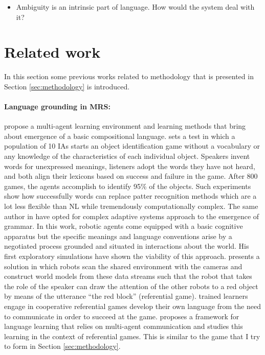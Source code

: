 \documentclass{article}
\begin{document}
\begin{multicols}{2}
\begin{itemize}
			\item Ambiguity is an intrinsic part of language. How would the system deal with it? 
		\end{itemize}		
	
	\section{Related work}\label{sec:related-work}
		In this section some previous works related to methodology that is presented in Section \ref{sec:methodology} is introduced.  
		
		\paragraph{Language grounding in MRS:}
		\cite{gauthier-2016-a-paradigm-for-situated-and-goal-driven-language-learning} propose a multi-agent learning environment and learning methods that bring about emergence of a basic compositional language. 
		\cite{steels-2016-agent-based-models-for-the-emergence-and-evolution-of-grammar} sets a test in which a population of 10 IAs starts an object identification game without a vocabulary or any knowledge of the characteristics of each individual object. Speakers invent words for unexpressed meanings, listeners adopt the words they have not heard, and both align their lexicons based on success and failure in the game. After 800 games, the agents accomplish to identify 95\% of the objects. Such experiments show how successfully words can replace patter recognition methods which are a lot less flexible than NL while tremendously computationally complex. The same author in \cite{steels-2000-the-emergence-of-grammar-in-communicating-autonomous-robotic-agents}  have opted for complex adaptive systems approach to the emergence of grammar. In this work, robotic agents come equipped with a basic cognitive apparatus but the specific meanings and language conventions arise by a negotiated process grounded and situated in interactions about the world. His first exploratory simulations have shown the viability of this approach. \cite{spranger-2012-open-ended-procedural-semantics} presents a solution in which robots scan the shared environment with the cameras and construct world models from these data streams such that the robot that takes the role of the speaker can draw the attention of the other robots to a red object by means of the utterance “the red block” (referential game). \cite{lazaridou-2016-towards-multi-agent-communication-based-language-learning} trained learners engage in cooperative referential games develop their own language from the need to communicate in order to succeed at the game.
		\cite{lazaridou-2017-multi-agent-cooperation-and-the-emergence-of-natural-language} proposes a framework for language learning that relies on multi-agent communication and studies this learning in the context of referential games. This is similar to the game that I try to form in Section \ref{sec:methodology}. 
		

\end{multicols}
\end{document}
